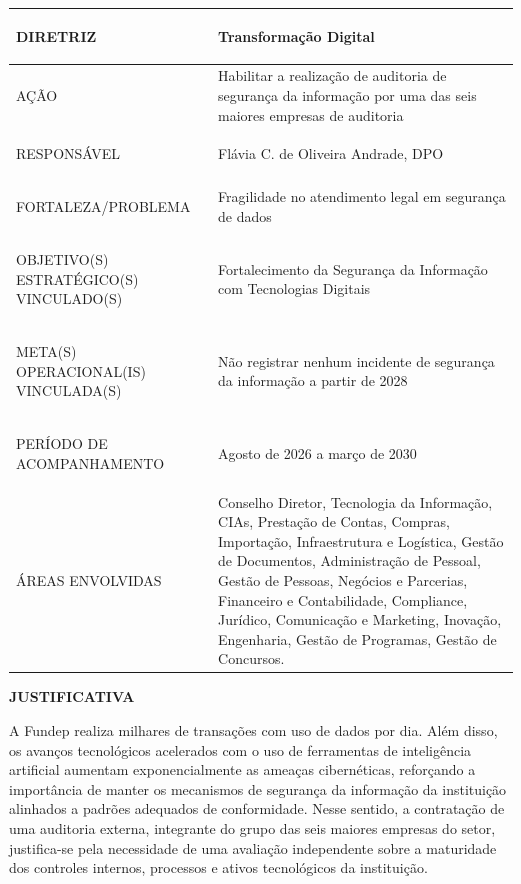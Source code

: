 \documentclass[12pt,a4paper]{article}
\newcommand{\PlanoVersao}{0.5}
\newcommand{\secao}[1]{%
  \par\vspace{\dimexpr16pt-\parskip\relax}%
  {\noindent\bfseries\color{azulTitulo}\fontsize{13}{16}\selectfont #1}%
  \par\vspace{\dimexpr8pt-\parskip\relax}%
}
\newlength{\utilTab}
\newlength{\colIdRot}\newlength{\colIdVal}
\begin{document}
\begingroup
\footnotesize\singlespacing
{}
\setlength{\arrayrulewidth}{1pt}
\setlength{\tabcolsep}{5.4pt}
\renewcommand{\arraystretch}{1.45}
\setlength{\utilTab}{\dimexpr\textwidth-4\tabcolsep-3\arrayrulewidth\relax}
\setlength{\colIdRot}{0.2819\utilTab}
\setlength{\colIdVal}{\dimexpr\utilTab-\colIdRot\relax}
\begin{tabular}{|>{\cellcolor{azulClaro}\bfseries\raggedright\arraybackslash}p{\colIdRot}|>{\raggedright\arraybackslash}p{\colIdVal}|}
\hline
DIRETRIZ & Transformação Digital \\
\hline
AÇÃO & Habilitar a realização de auditoria de segurança da informação por uma das seis maiores empresas de auditoria \\
\hline
RESPONSÁVEL & Flávia C. de Oliveira Andrade, DPO \\
\hline
FORTALEZA/PROBLEMA & Fragilidade no atendimento legal em segurança de dados \\
\hline
OBJETIVO(S) ESTRATÉGICO(S) VINCULADO(S) & Fortalecimento da Segurança da Informação com Tecnologias Digitais \\
\hline
META(S) OPERACIONAL(IS) VINCULADA(S) & Não registrar nenhum incidente de segurança da informação a partir de 2028 \\
\hline
PERÍODO DE ACOMPANHAMENTO & Agosto de 2026 a março de 2030 \\
\hline
ÁREAS ENVOLVIDAS & Conselho Diretor, Tecnologia da Informação, CIAs, Prestação de Contas, Compras, Importação, Infraestrutura e Logística, Gestão de Documentos, Administração de Pessoal, Gestão de Pessoas, Negócios e Parcerias, Financeiro e Contabilidade, Compliance, Jurídico, Comunicação e Marketing, Inovação, Engenharia, Gestão de Programas, Gestão de Concursos. \\
\hline
\end{tabular}
\endgroup

\secao{JUSTIFICATIVA}

A Fundep realiza milhares de transações com uso de dados por dia. Além disso, os avanços tecnológicos acelerados com o uso de ferramentas de inteligência artificial aumentam exponencialmente as ameaças cibernéticas, reforçando a importância de manter os mecanismos de segurança da informação da instituição alinhados a padrões adequados de conformidade. Nesse sentido, a contratação de uma auditoria externa, integrante do grupo das seis maiores empresas do setor, justifica-se pela necessidade de uma avaliação independente sobre a maturidade dos controles internos, processos e ativos tecnológicos da instituição.
\end{document}
